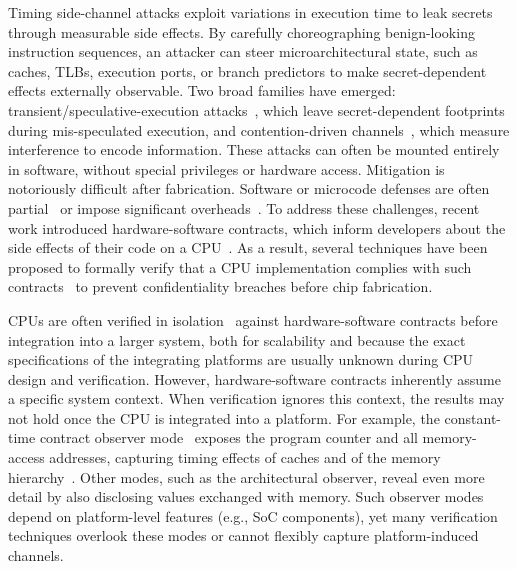 

Timing side-channel attacks exploit variations in execution time to leak secrets through measurable side effects.
By carefully choreographing benign-looking instruction sequences, an attacker can steer microarchitectural state, such as caches, TLBs, execution ports, or branch predictors to make secret-dependent effects externally observable.
Two broad families have emerged: transient/speculative-execution attacks~\cite{kocher2019spectre,lipp2018meltdown,van2019ridl,ragab2021rage,wikner2022retbleed,wikner2025bpi}, which leave secret-dependent footprints during mis-speculated execution, and contention-driven channels~\cite{bernstein2005cache,Liu2015LLC,YaromFalkner2014FlushReload,Yarom2016CacheBleed,Moghimi2018MemJam,Gruss2016PrefetchSCA}, which measure interference to encode information.
These attacks can often be mounted entirely in software, without special privileges or hardware access.
Mitigation is notoriously difficult after fabrication.
Software or microcode defenses are often partial~\cite{ridlad} or impose significant overheads~\cite{herzog2021price}.
% 
To address these challenges, recent work introduced hardware-software contracts, which inform developers about the side effects of their code on a CPU~\cite{guarnieri2021hardware,oleksenko2022revizor}.
As a result, several techniques have been proposed to formally verify that a CPU implementation complies with such contracts~\cite{dinesh2024conjunct,dinesh2025h,ceesay2024mucfi,wang2023specification,tan2025contractshadowlogic,hsiao2024rtl2mmupath} to prevent confidentiality breaches before chip fabrication.

CPUs are often verified in isolation~\cite{dinesh2024conjunct,dinesh2025h,ceesay2024mucfi,wang2023specification,tan2025contractshadowlogic,hsiao2024rtl2mmupath} against hardware-software contracts before integration into a larger system, both for scalability and because the exact specifications of the integrating platforms are usually unknown during CPU design and verification.
However, hardware-software contracts inherently assume a specific system context. When verification ignores this context, the results may not hold once the CPU is integrated into a platform.
For example, the constant-time contract observer mode~\cite{guarnieri2021hardware} exposes the program counter and all memory-access addresses, capturing timing effects of caches and of the memory hierarchy~\cite{guarnieri2021hardware,oleksenko2022revizor}.
Other modes, such as the architectural observer, reveal even more detail by also disclosing values exchanged with memory.
Such observer modes depend on platform-level features (e.g., SoC components), yet many verification techniques overlook these modes or cannot flexibly capture platform-induced channels.

